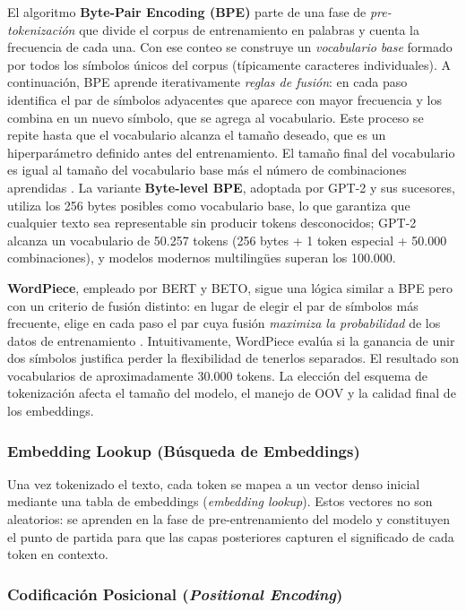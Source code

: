 \documentclass[11pt,a4paper]{article}
\begin{document}
El algoritmo \textbf{Byte-Pair Encoding (BPE)} parte de una fase de \emph{pre-tokenización} que divide el corpus de entrenamiento en palabras y cuenta la frecuencia de cada una. Con ese conteo se construye un \emph{vocabulario base} formado por todos los símbolos únicos del corpus (típicamente caracteres individuales). A continuación, BPE aprende iterativamente \emph{reglas de fusión}: en cada paso identifica el par de símbolos adyacentes que aparece con mayor frecuencia y los combina en un nuevo símbolo, que se agrega al vocabulario. Este proceso se repite hasta que el vocabulario alcanza el tamaño deseado, que es un hiperparámetro definido antes del entrenamiento. El tamaño final del vocabulario es igual al tamaño del vocabulario base más el número de combinaciones aprendidas \cite{huggingface-tokenizers}. La variante \textbf{Byte-level BPE}, adoptada por GPT-2 y sus sucesores, utiliza los 256 bytes posibles como vocabulario base, lo que garantiza que cualquier texto sea representable sin producir tokens desconocidos; GPT-2 alcanza un vocabulario de 50.257 tokens (256 bytes + 1 token especial + 50.000 combinaciones), y modelos modernos multilingües superan los 100.000.

\textbf{WordPiece}, empleado por BERT y BETO, sigue una lógica similar a BPE pero con un criterio de fusión distinto: en lugar de elegir el par de símbolos más frecuente, elige en cada paso el par cuya fusión \emph{maximiza la probabilidad} de los datos de entrenamiento \cite{huggingface-tokenizers}. Intuitivamente, WordPiece evalúa si la ganancia de unir dos símbolos justifica perder la flexibilidad de tenerlos separados. El resultado son vocabularios de aproximadamente 30.000 tokens. La elección del esquema de tokenización afecta el tamaño del modelo, el manejo de OOV y la calidad final de los embeddings.

\subsubsection{Embedding Lookup (Búsqueda de Embeddings)}

Una vez tokenizado el texto, cada token se mapea a un vector denso inicial mediante una tabla de embeddings (\textit{embedding lookup}). Estos vectores no son aleatorios: se aprenden en la fase de pre-entrenamiento del modelo y constituyen el punto de partida para que las capas posteriores capturen el significado de cada token en contexto.

\subsubsection{Codificación Posicional (\textit{Positional Encoding})}
\end{document}
